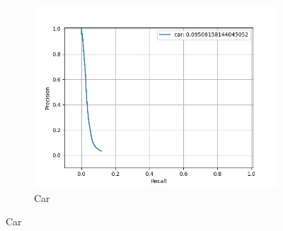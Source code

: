 \begin{figure}
\begin{subfigure}[t]{0.325\textwidth}
    		\includegraphics[width=\textwidth]{images/basic_pr/class_car_pr.jpg}
    		\caption{Car}
    	\end{subfigure}
        

\end{figure}
